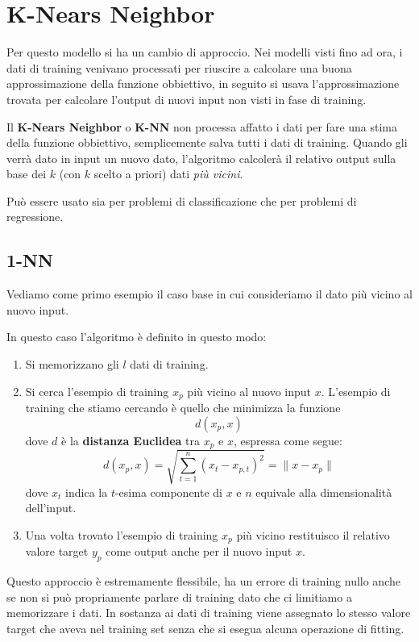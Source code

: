 \chapter{K-Nears Neighbor}
Per questo modello si ha un cambio di approccio. Nei modelli visti fino ad ora, i dati di training
venivano processati per riuscire a calcolare una buona approssimazione della funzione obbiettivo, in seguito si
usava l'approssimazione trovata per calcolare l'output di nuovi input non visti in fase di training.

Il \textbf{K-Nears Neighbor} o \textbf{K-NN} non processa affatto i dati per fare una stima della funzione obbiettivo,
semplicemente salva tutti i dati di training. Quando gli verr\`a dato in input un nuovo dato, l'algoritmo calcoler\`a
il relativo output sulla base dei $k$ (con $k$ scelto a priori) dati \emph{pi\`u vicini}.

Pu\`o essere usato sia per problemi di classificazione che per problemi di regressione.

\section{1-NN}
Vediamo come primo esempio il caso base in cui consideriamo il dato pi\`u vicino al nuovo input.

In questo caso l'algoritmo \`e definito in questo modo:
\begin{enumerate}
	\item Si memorizzano gli $l$ dati di training.
	\item Si cerca l'esempio di training $x_p$ pi\`u vicino al nuovo input $x$. L'esempio di training che stiamo
	      cercando \`e quello che minimizza la funzione
	      \[ d(x_p, x) \]
	      dove $d$ \`e la \textbf{distanza Euclidea} tra $x_p$ e $x$, espressa come segue:
	      \[ d(x_p, x) = \sqrt{\sum_{t=1}^n (x_t - x_{p, t})^2} = \| x - x_p \| \]
	      dove $x_t$ indica la $t$-esima componente di $x$ e $n$ equivale alla dimensionalit\`a dell'input.
	\item Una volta trovato l'esempio di training $x_p$ pi\`u vicino restituisco il relativo valore target $y_p$ come
	      output anche per il nuovo input $x$.
\end{enumerate}
Questo approccio \`e estremamente flessibile, ha un errore di training nullo anche se non si pu\`o propriamente
parlare di training dato che ci limitiamo a memorizzare i dati. In sostanza ai dati di training viene assegnato lo
stesso valore target che aveva nel training set senza che si esegua alcuna operazione di fitting.

